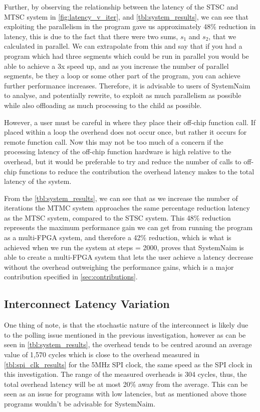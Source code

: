 Further, by observing the relationship between the latency of the STSC and MTSC system in \autoref{fig:latency_v_iter}, and \autoref{tbl:system_results}, we can see that exploiting the parallelism in the program gave us approximately 48\% reduction in latency, this is due to the fact that there were two sums, $s_1$ and $s_2$, that we calculated in parallel. We can extrapolate from this and say that if you had a program which had three segments which could be run in parallel you would be able to achieve a 3x speed up, and as you increase the number of parallel segments, be they a loop or some other part of the program, you can achieve further performance increases. Therefore, it is advisable to users of SystemNaim to analyse, and potentially rewrite, to exploit as much parallelism as possible while also offloading as much processing to the child as possible.

However, a user must be careful in where they place their off-chip function call. If placed within a loop the overhead does not occur once, but rather it occurs for remote function call. Now this may not be too much of a concern if the processing latency of the off-chip function hardware is high relative to the overhead, but it would be preferable to try and reduce the number of calls to off-chip functions to reduce the contribution the overhead latency makes to the total latency of the system.

From the \autoref{tbl:system_results}, we can see that as we increase the number of iterations the MTMC system approaches the same percentage reduction latency as the MTSC system, compared to the STSC system. This 48\% reduction represents the maximum performance gain we can get from running the program as a multi-FPGA system, and therefore a 42\% reduction, which is what is achieved when we run the system at steps = 2000, proves that SystemNaim is able to create a multi-FPGA system that lets the user achieve a latency decrease without the overhead outweighing the performance gains, which is a major contribution specified in \autoref{sec:contributions}. 

\subsection{Interconnect Latency Variation}

One thing of note, is that the stochastic nature of the interconnect is likely due to the polling issue mentioned in the previous investigation, however as can be seen in \autoref{tbl:system_results}, the overhead tends to be centred around an average value of 1,570 cycles which is close to the overhead measured in \autoref{tbl:spi_clk_results} for the 5MHz SPI clock, the same speed as the SPI clock in this investigation. The range of the measured overheads is 304 cycles, thus, the total overhead latency will be at most 20\% away from the average. This can be seen as an issue for programs with low latencies, but as mentioned above those programs wouldn't be advisable for SystemNaim. 

